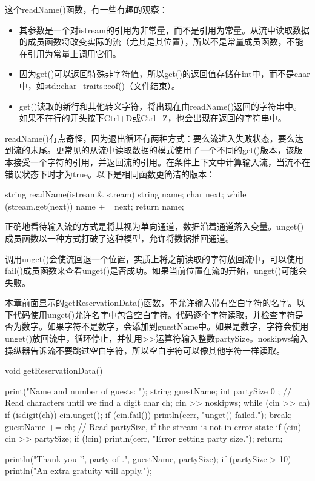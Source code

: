 这个readName()函数，有一些有趣的观察：

\begin{itemize}
\item
其参数是一个对istream的引用为非常量，而不是引用为常量。从流中读取数据的成员函数将改变实际的流（尤其是其位置），所以不是常量成员函数，不能在引用为常量上调用它们。

\item
因为get()可以返回特殊非字符值，所以get()的返回值存储在int中，而不是char中，如std::char\_traits::eof()（文件结束）。

\item
get()读取的新行和其他转义字符，将出现在由readName()返回的字符串中。如果不在行的开头按下Ctrl+D或Ctrl+Z，也会出现在返回的字符串中。
\end{itemize}

readName()有点奇怪，因为退出循环有两种方式：要么流进入失败状态，要么达到流的末尾。更常见的从流中读取数据的模式使用了一个不同的get()版本，该版本接受一个字符的引用，并返回流的引用。在条件上下文中计算输入流，当流不在错误状态下时才为true。以下是相同函数更简洁的版本：

\begin{cpp}
string readName(istream& stream)
{
    string name;
    char next;
    while (stream.get(next)) {
        name += next;
    }
    return name;
}
\end{cpp}


正确地看待输入流的方式是将其视为单向通道，数据沿着通道落入变量。unget()成员函数以一种方式打破了这种模型，允许将数据推回通道。

调用unget()会使流回退一个位置，实质上将之前读取的字符放回流中，可以使用fail()成员函数来查看unget()是否成功。如果当前位置在流的开始，unget()可能会失败。

本章前面显示的getReservationData()函数，不允许输入带有空白字符的名字。以下代码使用unget()允许名字中包含空白字符。代码逐个字符读取，并检查字符是否为数字。如果字符不是数字，会添加到guestName中。如果是数字，字符会使用unget()放回流中，循环停止，并使用>{}>运算符输入整数partySize。noskipws输入操纵器告诉流不要跳过空白字符，所以空白字符可以像其他字符一样读取。

\begin{cpp}
void getReservationData()
{
    print("Name and number of guests: ");
    string guestName;
    int partySize { 0 };
    // Read characters until we find a digit
    char ch;
    cin >> noskipws;
    while (cin >> ch) {
        if (isdigit(ch)) {
            cin.unget();
            if (cin.fail()) { println(cerr, "unget() failed."); }
            break;
        }
        guestName += ch;
    }
    // Read partySize, if the stream is not in error state
    if (cin) { cin >> partySize; }
    if (!cin) {
        println(cerr, "Error getting party size.");
        return;
    }

    println("Thank you '{}', party of {}.", guestName, partySize);
    if (partySize > 10) {
        println("An extra gratuity will apply.");
    }
}
\end{cpp}


